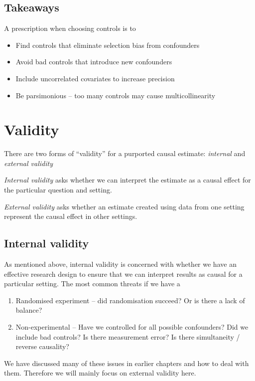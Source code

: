         \subsection{Takeaways}
            A prescription when choosing controls is to
            \begin{itemize}
                \item Find controls that eliminate selection bias from confounders
                \item Avoid bad controls that introduce new confounders
                \item Include uncorrelated covariates to increase precision
                \item Be parsimonious – too many controls may cause multicollinearity
            \end{itemize}


    \section{Validity}

        There are two forms of “validity” for a purported causal estimate: \textit{internal} and \textit{external validity}
        \begin{definition}
            \textit{Internal validity} asks whether we can interpret the estimate as a causal effect for the particular question and setting.
        \end{definition}
        \begin{definition}
            \textit{External validity} asks whether an estimate created using data from one setting represent the causal effect in other settings.
        \end{definition}
        
        \subsection{Internal validity}
            As mentioned above, internal validity is concerned with whether we have an effective research design to ensure that we can interpret results as causal for a particular setting. The most common threats if we have a 
            \begin{enumerate}
                \item Randomised experiment – did randomisation succeed? Or is there a lack of balance?
                \item Non-experimental – Have we controlled for all possible confounders? Did we include bad controls? Is there measurement error? Is there simultaneity / reverse causality?
            \end{enumerate}
            We have discussed many of these issues in earlier chapters and how to deal with them. Therefore we will mainly focus on external validity here.
            
